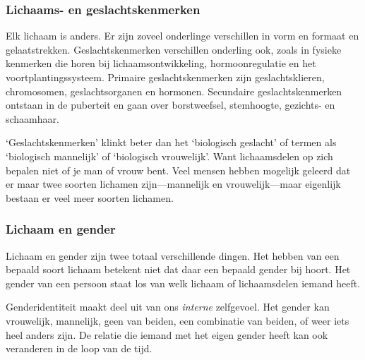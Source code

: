 \documentclass[12pt,openany]{book}
\begin{document}
\subsubsection*{Lichaams- en geslachtskenmerken}

Elk lichaam is anders. Er zijn zoveel onderlinge verschillen in vorm en formaat en gelaatstrekken. Geslachtskenmerken verschillen onderling ook, zoals in fysieke kenmerken die horen bij lichaamsontwikkeling, hormoonregulatie en het voortplantingssysteem. Primaire geslachtskenmerken zijn geslachtsklieren, chromosomen, geslachtsorganen en hormonen. Secundaire geslachtskenmerken ontstaan in de puberteit en gaan over borstweefsel, stemhoogte, gezichts- en schaamhaar.

`Geslachtskenmerken' klinkt beter dan het `biologisch geslacht' of termen als `biologisch mannelijk' of `biologisch vrouwelijk'. Want lichaamsdelen op zich bepalen niet of je man of vrouw bent. Veel mensen hebben mogelijk geleerd dat er maar twee soorten lichamen zijn—mannelijk en vrouwelijk—maar eigenlijk bestaan er veel meer soorten lichamen.

\begin{figure}[h]
    \centering
\end{figure}

\subsubsection*{Lichaam en gender}

Lichaam en gender zijn twee totaal verschillende dingen. Het hebben van een bepaald soort lichaam betekent niet dat daar een bepaald gender bij hoort. Het gender van een persoon staat los van welk lichaam of lichaamsdelen iemand heeft.

Genderidentiteit maakt deel uit van ons \textit{interne} zelfgevoel. Het gender kan vrouwelijk, mannelijk, geen van beiden, een combinatie van beiden, of weer iets heel anders zijn. De relatie die iemand met het eigen gender heeft kan ook veranderen in de loop van de tijd.
\end{document}

